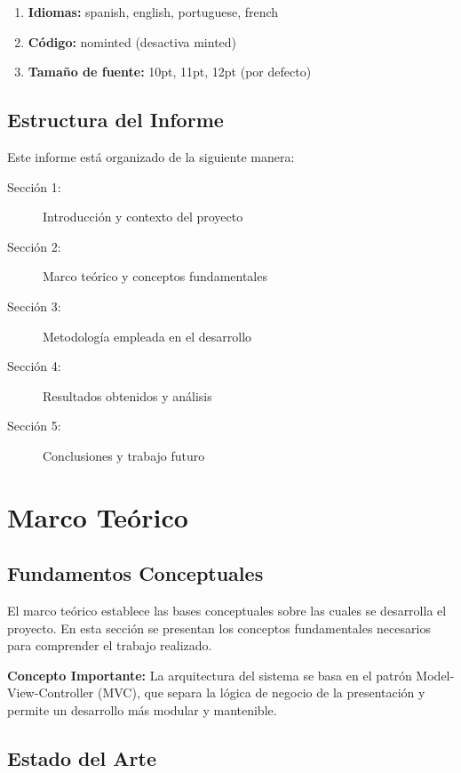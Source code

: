\documentclass{pt-report}
\begin{document}
\begin{enumerate}
    \item \textbf{Idiomas:} spanish, english, portuguese, french
    \item \textbf{Código:} nominted (desactiva minted)
    \item \textbf{Tamaño de fuente:} 10pt, 11pt, 12pt (por defecto)
\end{enumerate}

\subsection{Estructura del Informe}

Este informe está organizado de la siguiente manera:

\begin{description}
    \item[Sección 1:] Introducción y contexto del proyecto
    \item[Sección 2:] Marco teórico y conceptos fundamentales
    \item[Sección 3:] Metodología empleada en el desarrollo
    \item[Sección 4:] Resultados obtenidos y análisis
    \item[Sección 5:] Conclusiones y trabajo futuro
\end{description}

\section{Marco Teórico}

\subsection{Fundamentos Conceptuales}

El marco teórico establece las bases conceptuales sobre las cuales se desarrolla
el proyecto. En esta sección se presentan los conceptos fundamentales necesarios
para comprender el trabajo realizado.

\begin{highlightbox}
    \textbf{Concepto Importante:} La arquitectura del sistema se basa en el patrón
    Model-View-Controller (MVC), que separa la lógica de negocio de la presentación
    y permite un desarrollo más modular y mantenible.
\end{highlightbox}

\subsection{Estado del Arte}
\end{document}
